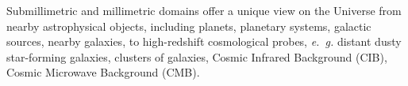 

Submillimetric and millimetric domains offer a unique view on the
Universe from nearby astrophysical objects, including planets,
planetary systems, galactic sources, nearby galaxies, to high-redshift
cosmological probes, \emph{e.~g.} distant dusty star-forming galaxies,
clusters of galaxies, Cosmic Infrared Background (CIB), Cosmic Microwave
Background (CMB).

